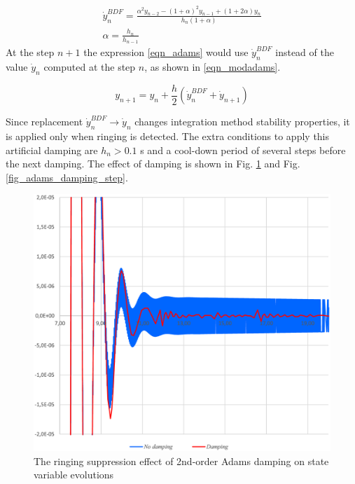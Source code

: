 \documentclass[lettersize,journal]{IEEEtran}
\begin{document}
\begin{equation}
	\label{eqn_adamsdsamp}
	\begin{array}{c}
	\dot{y}_n^{BDF}=\frac{\alpha^2y_{n-2}-(1+\alpha)^2y_{n-1}+(1+2\alpha)y_n}{h_n(1+\alpha)} \\
	\alpha=\frac{h_n}{h_{n-1}}
	\end{array}
\end{equation}
At the step \(n+1\) the expression \eqref{eqn_adams} would use \(\dot{y}_n^{BDF}\) instead of the value \(\dot{y}_n\) computed at the step \(n\), as shown in \eqref{eqn_modadams}.

\begin{equation}
	\label{eqn_modadams}
	y_{n+1}=y_n+\frac{h}{2}\left(\dot{y}_n^{BDF}+\dot{y}_{n+1} \right)
\end{equation}

Since replacement \(\dot{y}_n^{BDF} \rightarrow \dot{y}_n\) changes integration method stability properties, it is applied only when ringing is detected. The extra conditions to apply this artificial damping are \(h_n>0.1\) s and a cool-down period of several steps before the next damping. The effect of damping is shown in Fig. \ref{fig_adams_damping_variable} and Fig. \ref{fig_adams_damping_step}.

\begin{figure}[htbp]
	\centering
	\includegraphics[width=0.8\columnwidth]{adams_damping_variable.eps}
	\caption{The ringing suppression effect of 2nd-order Adams damping on state variable evolutions }
	\label{fig_adams_damping_variable}
\end{figure}
\end{document}
